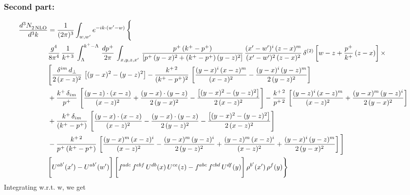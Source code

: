 \documentclass[9pt]{article}
\numberwithin{equation}{section}
\begin{document}
\subsubsection{Second part:}
\begin{align}
    \frac{d^{3}N_{2\,\rm NLO}^{\rm}}{d^{3}k}  & =  \frac{1}{(2\pi)^{3}}  \int_{w, w^\prime} e^{-ik\cdot(w^\prime-w)}\, \Bigg\{\notag \\ & \frac{g^{4}}{8\pi^{4}}\,\frac{1}{k^{+\,3}}\,\int_{\Lambda}^{k^{+}-\Lambda}\, \frac{dp^{+}}{2\pi} \, \int_{x,y,z,x'}\,\frac{p^{+}\,(k^{+}-p^{+})}{\left[p^{+}\,(y-x)^{2}+(k^{+}-p^{+})\,(y-z)^{2}\right]}\, \frac{(x'-w')^{i}\,(z-x)^{m}}{(x'-w')^{2}\,(z-x)^{2}}\,\delta^{(2)}\left[w-z+\frac{p^{+}}{k^{+}}\,(z-x)\right]\times \notag \\ & \Bigg[\frac{\delta^{im}\,d_{\perp}}{2\,(x-z)^{2}}\,\left[(y-x)^{2}-(y-z)^{2}\right]-\frac{k^{+\,2}}{(k^{+}-p^{+})^{2}}\,\left[\frac{(y-x)^{i}\,(x-z)^{m}}{(x-z)^{2}}-\frac{(y-x)^{i}\,(y-z)^{m}}{2\,(y-z)^{2}}\right]\notag \\ & +\frac{k^{+}\,\delta_{im}}{p^{+}}\,\left[\frac{(y-z)\cdot (x-z)}{(x-z)^{2}}+\frac{(y-x)\cdot (y-z)}{2\,(y-x)^{2}}-\frac{\left[(y-x)^{2}-(y-z)^{2}\right]}{2\,(x-z)^{2}}\right]-\frac{k^{+\,2}}{p^{+\,2}}\,\left[\frac{(y-z)^{i}\,(x-z)^{m}}{(x-z)^{2}}+\frac{(y-x)^{m}\,(y-z)^{i}}{2\,(y-x)^{2}}\right]\notag \\ & +\frac{k^{+}\,\delta_{im}}{(k^{+}-p^{+})}\,\left[\frac{(y-x)\cdot (x-z)}{(x-z)^{2}}-\frac{(y-x)\cdot (y-z)}{2\,(y-z)^{2}}-\frac{\left[(y-x)^{2}-(y-z)^{2}\right]}{2\,(x-z)^{2}}\right]\notag \\ &-\frac{k^{+\,2}}{p^{+}\, (k^{+}-p^{+})}\,\left[\frac{(y-x)^{m}\,(x-z)^{i}}{(x-z)^{2}}-\frac{(y-x)^{m}\,(y-z)^{i}}{2\,(y-z)^{2}}+\frac{(y-z)^{m}\,(x-z)^{i}}{(x-z)^{2}}+\frac{(y-x)^{i}\,(y-z)^{m}}{2\,(y-x)^{2}}\right]\Bigg] \notag \\ & \Bigg[U^{ab'}(x')-U^{ab'}(w')\Bigg]\,\Bigg[f^{adc}\,f^{ebf}\,U^{db}(x)\,U^{ce}(z)-f^{abc}\,f^{cbd}\,U^{df}(y)\Bigg]\,\rho^{b'}(x')\,\rho^{f}(y)\Bigg\}
\end{align}
Integrating w.r.t. w, we get
\end{document}
